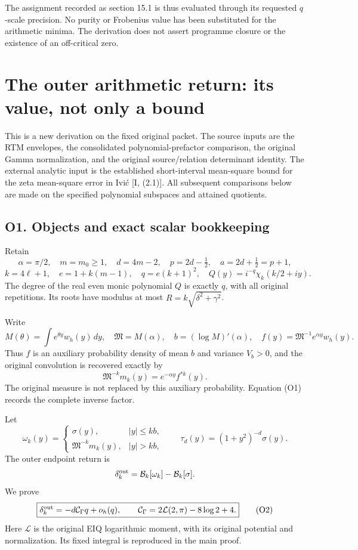 The assignment recorded as section 15.1 is thus evaluated through its
requested \(q\)-scale precision. No purity or Frobenius value has been
substituted for the arithmetic minima. The derivation does not assert
programme closure or the existence of an off-critical zero.

\newpage

\section{The outer arithmetic return: its value, not only a
bound}\label{sa:the-outer-arithmetic-return-its-value-not-only-a-bound}

This is a new derivation on the fixed original packet. The source inputs
are the RTM envelopes, the consolidated polynomial-prefactor comparison,
the original Gamma normalization, and the original source/relation
determinant identity. The external analytic input is the established
short-interval mean-square bound for the zeta mean-square error in Ivić
{[}I, (2.1){]}. All subsequent comparisons below are made on the
specified polynomial subspaces and attained quotients.

\subsection{O1. Objects and exact scalar
bookkeeping}\label{sa:o1.-objects-and-exact-scalar-bookkeeping}

Retain \[
\alpha=\pi/2,\quad m=m_0\ge1,\quad d=4m-2,\quad
p=2d-\tfrac12,\quad a=2d+\tfrac12=p+1,
\] \[
k=4\ell+1,\quad e=1+k(m-1),\quad q=e(k+1)^2,
\quad Q(y)=i^{-q}\chi_k(k/2+iy).
\] The degree of the real even monic polynomial \(Q\) is exactly \(q\),
with all original repetitions. Its roots have modulus at most
\(R=k\sqrt{\delta^2+\gamma^2}\).

Write \[
M(\theta)=\int e^{\theta y}w_h(y)\,dy,\quad
\mathfrak M=M(\alpha),\quad b=(\log M)'(\alpha),
\quad f(y)=\mathfrak M^{-1}e^{\alpha y}w_h(y).
\] Thus \(f\) is an auxiliary probability density of mean \(b\) and
variance \(V_b>0\), and the original convolution is recovered exactly by
\[
\boxed{\mathfrak M^{-k}m_k(y)=e^{-\alpha y}f^{*k}(y).}\tag{O1}
\] The original measure is not replaced by this auxiliary probability.
Equation (O1) records the complete inverse factor.

Let \[
\omega_k(y)=\begin{cases}\sigma(y),&|y|\le kb,\\
\mathfrak M^{-k}m_k(y),&|y|>kb,
\end{cases}
\qquad \tau_d(y)=(1+y^2)^{-d}\sigma(y).
\] The outer endpoint return is \[
\delta_k^{\rm out}=\mathcal B_k[\omega_k]-\mathcal B_k[\sigma].
\] We prove \[
\boxed{\delta_k^{\rm out}=-d\mathcal C_\Gamma q+o_h(q),
\qquad \mathcal C_\Gamma=2\mathcal L(2,\pi)-8\log2+4.}\tag{O2}
\] Here \(\mathcal L\) is the original EIQ logarithmic moment, with its
original potential and normalization. Its fixed integral is reproduced
in the main proof.

